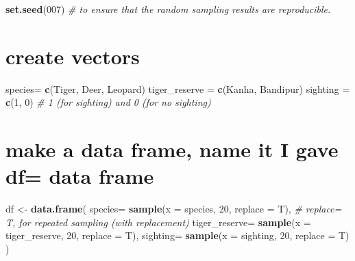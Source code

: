 \documentclass[
]{book}
\newenvironment{Shaded}{\begin{snugshade}}{\end{snugshade}}
\newcommand{\AttributeTok}[1]{\textcolor[rgb]{0.13,0.29,0.53}{#1}}
\newcommand{\CommentTok}[1]{\textcolor[rgb]{0.56,0.35,0.01}{\textit{#1}}}
\newcommand{\DecValTok}[1]{\textcolor[rgb]{0.00,0.00,0.81}{#1}}
\newcommand{\FunctionTok}[1]{\textcolor[rgb]{0.13,0.29,0.53}{\textbf{#1}}}
\newcommand{\NormalTok}[1]{#1}
\newcommand{\OtherTok}[1]{\textcolor[rgb]{0.56,0.35,0.01}{#1}}
\newcommand{\StringTok}[1]{\textcolor[rgb]{0.31,0.60,0.02}{#1}}
\begin{document}
\begin{Shaded}
\begin{Highlighting}[]
\FunctionTok{set.seed}\NormalTok{(}\DecValTok{007}\NormalTok{) }\CommentTok{\# to ensure that the random sampling results are reproducible.}
\end{Highlighting}
\end{Shaded}

\hypertarget{create-vectors}{%
\section{create vectors}\label{create-vectors}}

\begin{Shaded}
\begin{Highlighting}[]
\NormalTok{species}\OtherTok{=} \FunctionTok{c}\NormalTok{(}\StringTok{\textquotesingle{}Tiger\textquotesingle{}}\NormalTok{, }\StringTok{\textquotesingle{}Deer\textquotesingle{}}\NormalTok{, }\StringTok{\textquotesingle{}Leopard\textquotesingle{}}\NormalTok{)}
\NormalTok{tiger\_reserve }\OtherTok{=} \FunctionTok{c}\NormalTok{(}\StringTok{\textquotesingle{}Kanha\textquotesingle{}}\NormalTok{, }\StringTok{\textquotesingle{}Bandipur\textquotesingle{}}\NormalTok{)}
\NormalTok{sighting }\OtherTok{=} \FunctionTok{c}\NormalTok{(}\DecValTok{1}\NormalTok{, }\DecValTok{0}\NormalTok{) }\CommentTok{\# 1 (for sighting) and 0 (for no sighting)}
\end{Highlighting}
\end{Shaded}

\hypertarget{make-a-data-frame-name-it-i-gave-df-data-frame}{%
\section{make a data frame, name it I gave df= data frame}\label{make-a-data-frame-name-it-i-gave-df-data-frame}}

\begin{Shaded}
\begin{Highlighting}[]
\NormalTok{df }\OtherTok{\textless{}{-}} \FunctionTok{data.frame}\NormalTok{(}
  \AttributeTok{species=} \FunctionTok{sample}\NormalTok{(}\AttributeTok{x =}\NormalTok{ species, }\DecValTok{20}\NormalTok{, }\AttributeTok{replace =}\NormalTok{ T), }\CommentTok{\# replace= T, for repeated sampling (with replacement)}
  \AttributeTok{tiger\_reserve=} \FunctionTok{sample}\NormalTok{(}\AttributeTok{x =}\NormalTok{ tiger\_reserve, }\DecValTok{20}\NormalTok{, }\AttributeTok{replace =}\NormalTok{ T),}
  \AttributeTok{sighting=} \FunctionTok{sample}\NormalTok{(}\AttributeTok{x =}\NormalTok{ sighting, }\DecValTok{20}\NormalTok{, }\AttributeTok{replace =}\NormalTok{ T)}
\NormalTok{)}
\end{Highlighting}
\end{Shaded}
\end{document}
